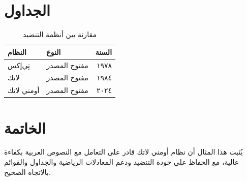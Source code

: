 \documentclass[doctype=article,language=arabic]{../../omnilatex}
\begin{document}
\section{الجداول}

\begin{table}[htbp]
  \caption{مقارنة بين أنظمة التنضيد}
  \begin{tabular}{llr}
    \textbf{النظام} & \textbf{النوع} & \textbf{السنة} \\
    \hline
    تِي‌إكس & مفتوح المصدر & ١٩٧٨ \\
    لاتك & مفتوح المصدر & ١٩٨٤ \\
    أومني لاتك & مفتوح المصدر & ٢٠٢٤ \\
  \end{tabular}
\end{table}

\section{الخاتمة}

يُثبت هذا المثال أن نظام أومني لاتك قادر على التعامل مع النصوص
العربية بكفاءة عالية، مع الحفاظ على جودة التنضيد ودعم المعادلات
الرياضية والجداول والقوائم بالاتجاه الصحيح.
\end{document}
